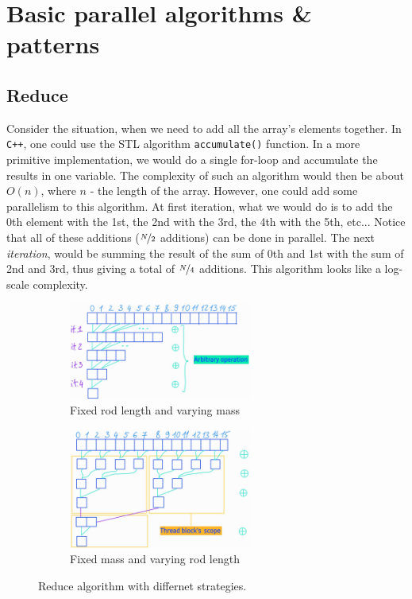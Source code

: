 \documentclass[12pt]{article}
\begin{document}
\section{Basic parallel algorithms \& patterns}
\subsection{Reduce}
Consider the situation, when we need to add all the array's elements together. In \verb|C++|, one could use 
the STL algorithm \verb|accumulate()| function. In a more primitive implementation, we would do a single for-loop 
and accumulate the results in one variable. The complexity of such an algorithm would then be about $O(n)$, where 
$n$ - the length of the array. However, one could add some parallelism to this algorithm. At first iteration, what we would 
do is to add the 0th element with the 1st, the 2nd with the 3rd, the 4th with the 5th, etc... Notice that 
all of these additions ($\nicefrac{N}{2}$ additions) can be done in parallel. The next \textit{iteration}, would be 
summing the result of the sum of 0th and 1st with the sum of 2nd and 3rd, thus giving a total of 
$\nicefrac{N}{4}$ additions. This algorithm looks like a log-scale complexity. 



\begin{figure}
   \centering
   \begin{subfigure}[t]{0.45\textwidth}
        \centering
        \includegraphics[width=6cm]{pngs/reduce_global.jpg}
        \caption{Fixed rod length and varying mass}
        \label{fig:static}
    \end{subfigure}
    \begin{subfigure}[t]{0.45\textwidth}
        \centering
        \includegraphics[width=6cm]{pngs/reduce_shared.jpg}
        \caption{Fixed mass and varying rod length}
        \label{fig:dynamic}
    \end{subfigure}
\label{fig:reduce}
    \caption{Reduce algorithm with differnet strategies.}
\end{figure}
\end{document}
